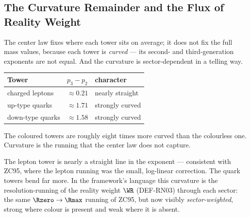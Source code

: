 \documentclass[12pt, a4paper]{article}
\begin{document}

\subsection{The Curvature Remainder and the Flux of Reality Weight}
\label{sec:curvature-zc97}

The center law fixes where each tower sits on average; it does not fix the full
mass values, because each tower is \emph{curved} --- its second- and
third-generation exponents are not equal. And the curvature is sector-dependent
in a telling way.

\begin{keybox}[title={Within-tower curvature $p_3-p_2$ (common scale)}]
{\footnotesize\renewcommand{\arraystretch}{1.3}
\begin{center}
\begin{tabular}{@{}lll@{}}
\toprule
Tower & $p_3-p_2$ & character \\
\midrule
charged leptons & $\approx 0.21$ & nearly straight \\
up-type quarks  & $\approx 1.71$ & strongly curved \\
down-type quarks& $\approx 1.58$ & strongly curved \\
\bottomrule
\end{tabular}
\end{center}}
\smallskip
\footnotesize The coloured towers are roughly eight times more curved than the
colourless one. Curvature is the running that the center law does not capture.
\end{keybox}

The lepton tower is nearly a straight line in the exponent --- consistent with
ZC95, where the lepton running was the small, log-linear correction. The quark
towers bend far more. In the framework's language this curvature is the
resolution-running of the reality weight $\WR$ (DEF-RN03) through each sector:
the same $\Rzero\to\Rmax$ running of ZC95, but now visibly \emph{sector-weighted},
strong where colour is present and weak where it is absent.
\end{document}
